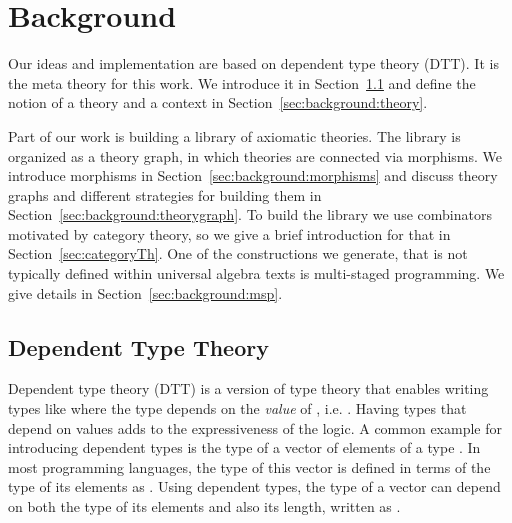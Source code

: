 \chapter{Background}
\label{ch:background}
Our ideas and implementation are based on dependent type theory (DTT). It is the meta theory for this work. We introduce it in Section~\ref{subsec:background:dtt} and define the notion of a theory and a context in Section~\ref{sec:background:theory}.

Part of our work is building a library of axiomatic theories. The library is organized as a theory graph, in which theories are connected via morphisms. We introduce morphisms in Section~\ref{sec:background:morphisms} and discuss theory graphs and different strategies for building them in Section~\ref{sec:background:theorygraph}. 
To build the library we use combinators motivated by category theory, so we give a brief introduction for that in Section~\ref{sec:categoryTh}. 
One of the constructions we generate, that is not typically defined within universal algebra texts is multi-staged programming. We give details in Section~\ref{sec:background:msp}. 

\section{Dependent Type Theory}
\label{subsec:background:dtt}
Dependent type theory (DTT) is a version of type theory that enables writing types like 
where the type  depends on the \emph{value} of , i.e. . 
Having types that depend on values adds to the expressiveness of the logic. A common example for introducing dependent types is the type of a vector of  elements of a type . 
In most programming languages, the type of this vector is defined in terms of the type of its elements as . Using dependent types, the type of a vector can depend on both the type of its elements and also its length, written as .
 
